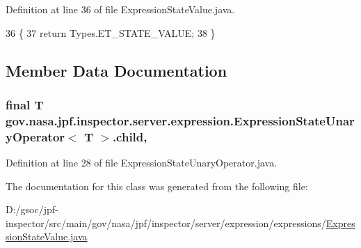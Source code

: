 Definition at line 36 of file Expression\+State\+Value.\+java.


\begin{DoxyCode}
36                           \{
37     \textcolor{keywordflow}{return} Types.ET\_STATE\_VALUE;
38   \}
\end{DoxyCode}


\subsection{Member Data Documentation}
\subsubsection[{\texorpdfstring{child}{child}}]{\setlength{\rightskip}{0pt plus 5cm}final T {\bf gov.\+nasa.\+jpf.\+inspector.\+server.\+expression.\+Expression\+State\+Unary\+Operator}$<$ T $>$.child\hspace{0.3cm}{\ttfamily [protected]}, {\ttfamily [inherited]}}\hypertarget{classgov_1_1nasa_1_1jpf_1_1inspector_1_1server_1_1expression_1_1_expression_state_unary_operator_a66041b1f569a361549e28a00f7ca5f2f}{}\label{classgov_1_1nasa_1_1jpf_1_1inspector_1_1server_1_1expression_1_1_expression_state_unary_operator_a66041b1f569a361549e28a00f7ca5f2f}


Definition at line 28 of file Expression\+State\+Unary\+Operator.\+java.



The documentation for this class was generated from the following file\+:\begin{DoxyCompactItemize}
\item 
D\+:/gsoc/jpf-\/inspector/src/main/gov/nasa/jpf/inspector/server/expression/expressions/\hyperlink{_expression_state_value_8java}{Expression\+State\+Value.\+java}\end{DoxyCompactItemize}
